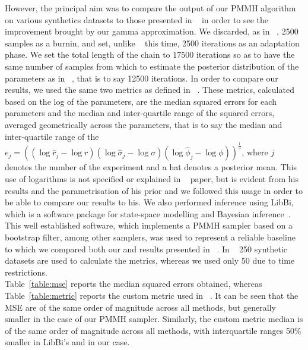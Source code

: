 \documentclass[12pt]{article}
\begin{document}
	However, the principal aim was to compare the output of our PMMH algorithm on various synthetics datasets to those presented in ~\cite{fasiolo2014statistical} in order to see the improvement brought by our gamma approximation. We discarded, as in ~\cite{fasiolo2014statistical}, 2500 samples as a burnin, and set, unlike ~\cite{fasiolo2014statistical} this time, 2500 iterations as an adaptation phase. We set the total length of the chain to 17500 iterations so as to have the same number of samples from which to estimate the posterior distribution of the parameters as in ~\cite{fasiolo2014statistical}, that is to say 12500 iterations. In order to compare our results, we used the same two metrics as defined in ~\cite{fasiolo2014statistical}. These metrics, calculated based on the log of the parameters, are the median squared errors for each parameters and the median and inter-quartile range of the squared errors, averaged geometrically across the parameters, that is to say the median and inter-quartile range of the $e_j = ((\log\hat{ r}_j-\log r)(\log\hat{\sigma}_j-\log\sigma)(\log\hat{\phi}_j-\log\phi))^\frac{1}{3}$, where $j$ denotes the number of the experiment and a hat denotes a posterior mean. This use of logarithms is not specified or explained in ~\cite{fasiolo2014statistical} paper, but is evident from his results and the parametrisation of his prior and we followed this usage in order to be able to compare our results to his. We also performed inference using LibBi, which is a software package for state-space modelling and Bayesian inference~\cite{murray2013bayesian}. This well established software, which implements a PMMH sampler based on a bootstrap filter, among other samplers, was used to represent a reliable baseline to which we compared both our and results presented in ~\cite{fasiolo2014statistical}. In ~\cite{fasiolo2014statistical} 250 synthetic datasets are used to calculate the metrics, whereas we used only 50 due to time restrictions. \\
	Table~\ref{table:mse} reports the median squared errors obtained, whereas Table~\ref{table:metric} reports the custom metric used in ~\cite{fasiolo2014statistical}. It can be seen that the MSE are of the same order of magnitude across all methods, but generally smaller in the case of our PMMH sampler. Similarly, the custom metric median is of the same order of magnitude across all methods, with interquartile ranges 50\% smaller in LibBi's and in our case.
	
\end{document}
